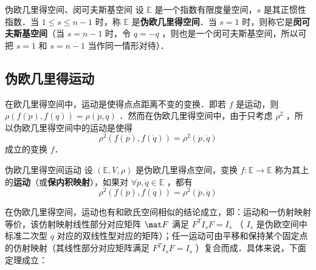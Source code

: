 \begin{definition}{伪欧几里得空间、闵可夫斯基空间}
设 $\mathbb E$ 是一个指数有限度量空间，$s$ 是其正惯性指数．当 $1\leq s\leq n-1$ 时，称 $\mathbb E$ 是\textbf{伪欧几里得空间}．当 $s=1$ 时，则称它是\textbf{闵可夫斯基空间}（当 $s=n-1$ 时，令 $q=-q$ ，则也是一个闵可夫斯基空间，所以可把 $s=1$ 和 $s=n-1$ 当作同一情形对待）．
\end{definition}
\subsection{伪欧几里得运动}
在欧几里得空间中，运动是使得点点距离不变的变换．即若 $f$ 是运动，则 $\rho(f(\dot p),f(\dot q))=\rho(\dot p,\dot q)$ ．然而在伪欧几里得空间中，由于只考虑 $\rho^2$ ，所以伪欧几里得空间中的运动是使得
\begin{equation}
\rho^2(f(\dot p),f(\dot q))=\rho^2(\dot p,\dot q)
\end{equation}
成立的变换 $f$．
\begin{definition}{伪欧几里得空间运动}
设 $(\mathbb E,V,\rho)$ 是伪欧几里得点空间，变换 $f:\mathbb E\rightarrow\mathbb E$ 称为其上的\textbf{运动}（或\textbf{保内积映射}），如果对 $\forall \dot p,\dot q\in\mathbb E$ ，都有
\begin{equation}
\rho^2(f(\dot p),f(\dot q))=\rho^2(\dot p,\dot q)
\end{equation}
\end{definition}
在伪欧几里得空间，运动也有和欧氏空间相似的结论成立，即：运动和一仿射映射等价，该仿射映射线性部分对应矩阵 $\mat F$ 满足 $F^TI_sF=I_s$ （ $I_s$ 是伪欧空间中标准二次型 $q$ 对应的双线性型对应的矩阵）；任一运动可由平移和保持某个固定点的仿射映射（其线性部分对应矩阵满足 $F^TI_sF=I_s$ ）复合而成．具体来说，下面定理成立：
\begin{theorem}{}

\end{theorem}